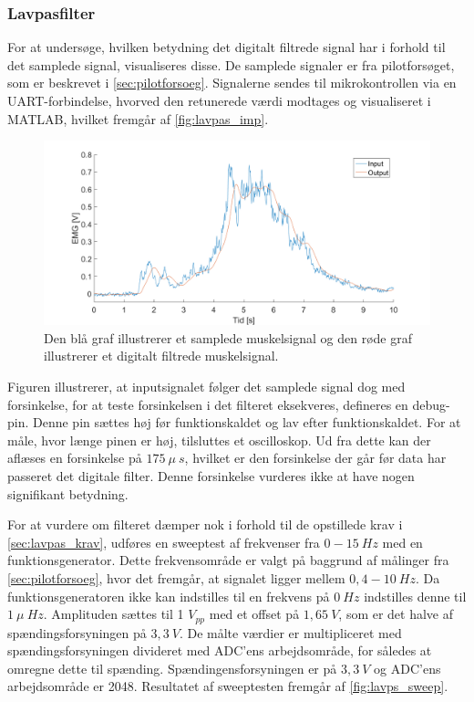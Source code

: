 \subsubsection{Lavpasfilter}
For at undersøge, hvilken betydning det digitalt filtrede signal har i forhold til det samplede signal, visualiseres disse. De samplede signaler er fra pilotforsøget, som er beskrevet i \autoref{sec:pilotforsoeg}. Signalerne sendes til mikrokontrollen via en UART-forbindelse, hvorved den retunerede værdi modtages og visualiseret i MATLAB, hvilket fremgår af \autoref{fig:lavpas_imp}.

\begin{figure}[H]
\centering
\includegraphics[width=1\textwidth]{figures/EMG_test}
\caption{Den blå graf illustrerer et samplede muskelsignal og den røde graf illustrerer et digitalt filtrede muskelsignal.}
\label{fig:lavpas_imp}
\end{figure}

\noindent
Figuren illustrerer, at inputsignalet følger det samplede signal dog med forsinkelse, for at teste forsinkelsen i det filteret eksekveres, defineres en debug-pin. Denne pin sættes høj før funktionskaldet og lav efter funktionskaldet. For at måle, hvor længe pinen er høj, tilsluttes et oscilloskop. Ud fra dette kan der aflæses en forsinkelse på $175~\mu~s$, hvilket er den forsinkelse der går før data har passeret det digitale filter. Denne forsinkelse vurderes ikke at have nogen signifikant betydning.

For at vurdere om filteret dæmper nok i forhold til de opstillede krav i \autoref{sec:lavpas_krav}, udføres en sweeptest af frekvenser fra $0-15~Hz$ med en funktionsgenerator. Dette frekvensområde er valgt på baggrund af målinger fra \autoref{sec:pilotforsoeg}, hvor det fremgår, at signalet ligger mellem $0,4-10~Hz$.  Da funktionsgeneratoren ikke kan indstilles til en frekvens på $0~Hz$ indstilles denne til $1~\mu~Hz$. Amplituden sættes til 1 $V_{pp}$ med et offset på $1,65~V$, som er det halve af spændingsforsyningen på $3,3~V$. De målte værdier er multipliceret med spændingsforsyningen divideret med ADC'ens arbejdsområde, for således at omregne dette til spænding. Spændingensforsyningen er på $3,3~V$ og ADC'ens arbejdsområde er 2048. Resultatet af sweeptesten fremgår af \autoref{fig:lavps_sweep}.

